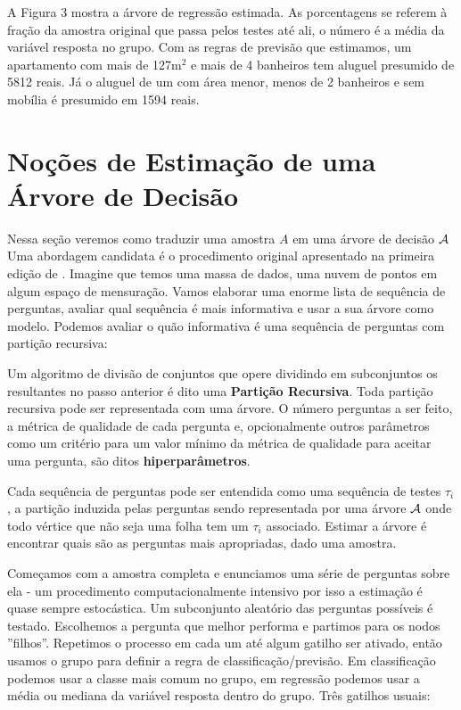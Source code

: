 A Figura 3 mostra a árvore de regressão estimada. As porcentagens se referem à fração da amostra original que passa pelos testes até ali, o número é a média da variável resposta no grupo. Com as regras de previsão que estimamos, um apartamento com mais de 127m$^2$ e mais de 4 banheiros tem aluguel presumido de 5812 reais. Já o aluguel de um com área menor, menos de 2 banheiros e sem mobília é presumido em 1594 reais.
 
 
\section{Noções de Estimação de uma Árvore de Decisão}

Nessa seção veremos como traduzir uma amostra $A$ em uma árvore de decisão $\mathcal{A}$ Uma abordagem candidata é o procedimento original apresentado na primeira edição de . Imagine que temos uma massa de dados, uma nuvem de pontos em algum espaço de mensuração. Vamos elaborar uma enorme lista de sequência de perguntas, avaliar qual sequência é mais informativa e usar a sua árvore como modelo. Podemos avaliar o quão informativa é uma sequência de perguntas com partição recursiva:

\begin{defi}
Um algoritmo de divisão de conjuntos que opere dividindo em subconjuntos os resultantes no passo anterior é dito uma \textbf{Partição Recursiva}. Toda partição recursiva pode ser representada com uma árvore. O número perguntas a ser feito, a métrica de qualidade de cada pergunta e, opcionalmente outros parâmetros como um critério para um valor mínimo da métrica de qualidade para aceitar uma pergunta, são ditos \textbf{hiperparâmetros}.
\end{defi}

Cada sequência de perguntas pode ser entendida como uma sequência de testes $\tau_i$, a partição induzida pelas perguntas sendo representada por uma árvore $\mathcal{A}$ onde todo vértice que não seja uma folha tem um $\tau_i$ associado. Estimar a árvore é encontrar quais são as perguntas mais apropriadas, dado uma amostra. 

Começamos com a amostra completa e enunciamos uma série de perguntas sobre ela - um procedimento computacionalmente intensivo por isso a estimação é quase sempre estocástica. Um subconjunto aleatório das perguntas possíveis é testado. Escolhemos a pergunta que melhor performa e partimos para os nodos ''filhos''. Repetimos o processo em cada um até algum gatilho ser ativado, então usamos o grupo para definir a regra de classificação/previsão. Em classificação podemos usar a classe mais comum no grupo, em regressão podemos usar a média ou mediana da variável resposta dentro do grupo. Três gatilhos usuais:

